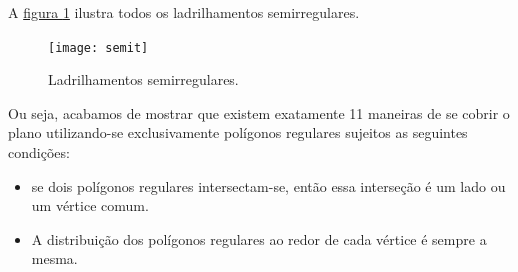 A \hyperref[semit]{figura \ref{semit}} ilustra todos os ladrilhamentos semirregulares.


\begin{figure}[H]
\centering
\texttt{[image: semit]}
\caption{Ladrilhamentos semirregulares.}
\label{semit}
\end{figure}

Ou seja, acabamos de mostrar que existem exatamente 11 maneiras de se cobrir o plano utilizando-se exclusivamente polígonos regulares sujeitos as seguintes condições:
\begin{itemize}
\item se dois polígonos regulares intersectam-se, então essa interseção é um lado ou um vértice comum.
\item A distribuição dos polígonos regulares ao redor de cada vértice é sempre a mesma.
\end{itemize}







